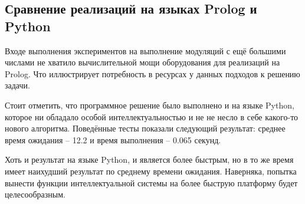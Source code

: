 	\subsection{Сравнение реализаций на языках Prolog и Python}

		Входе выполнения экспериментов на выполнение модуляций с ещё большими числами не хватило вычислительной мощи
			оборудования для реализаций на Prolog. Что иллюстрирует потребность в ресурсах у данных подходов
			к решению задачи.
		
		Стоит отметить, что программное решение было выполнено и на языке Python, которое ни обладало
			особой интеллектуальностью и не не несло в себе какого-то нового алгоритма. Поведённые тесты
			показали следующий результат: среднее время ожидания -- 12.2 и время выполнения -- 0.065 секунд.

		Хоть и результат на языке Python, и является более быстрым, но в то же время имеет наихудший результат
			по среднему времени ожидания. Наверняка, попытка вынести функции интеллектуальной системы 
			на более быструю платформу будет целесообразным.
